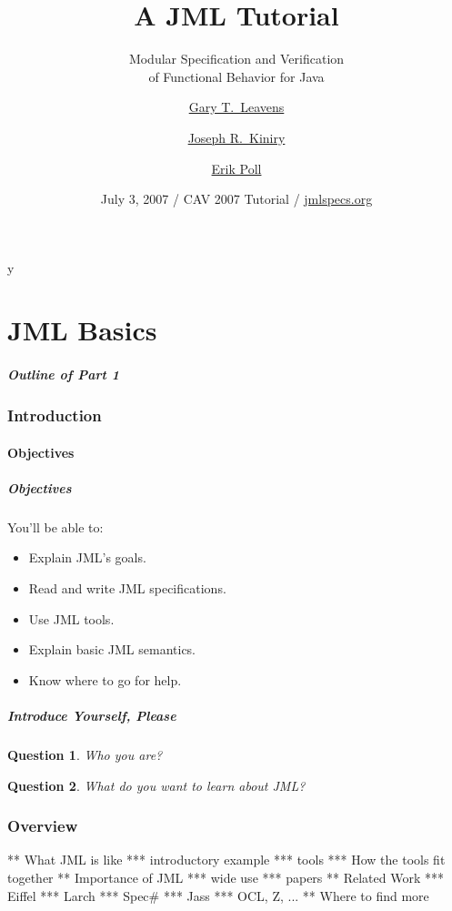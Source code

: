 \if y\MAKEHANDOUTS \documentclass[compress,landscape,handout]{beamer}
\title[JML Tutorial]{A JML Tutorial}
\subtitle{Modular Specification and Verification \\
of Functional Behavior for Java}
\author[Gary T. Leavens] %
{\href{http://www.cs.iastate.edu/~leavens/}{Gary T.~Leavens}\inst{1}
  \and \href{http://secure.ucd.ie/~kiniry/}{Joseph R.~Kiniry}\inst{2}
  \and \href{http://www.cs.ru.nl/~erikpoll/}{Erik Poll}\inst{3}}
\institute[ISU] %
{
  \inst{1}%
  Department of Computer Science\\
  Iowa State University (moving to UCF)
  \and
  \inst{2}%
  School of Computer Science and Informatics \\
  University College Dublin
  \and
  \inst{3}%
  Computing Science Department \\
  Radboud University Nijmegen
}
\date[CAV 2007]{July 3, 2007 / CAV 2007 Tutorial / \href{http://www.jmlspecs.org}{jmlspecs.org}}
\newtheorem*{question}{Question}
\begin{document}
\begin{frame}
  \titlepage
\end{frame}

\part{JML Basics}

\begin{frame}
\frametitle{Outline of Part 1}
  \tableofcontents
\end{frame}

\section{Introduction}

\subsection{Objectives}

\begin{frame}
\frametitle{Objectives}

You'll be able to:
  \begin{itemize}
  \item
    Explain JML's goals.
  \item
    Read and write JML specifications.
  \item
    Use JML tools.
  \item
    Explain basic JML semantics.
  \item
    Know where to go for help.
  \end{itemize}
\end{frame}

\begin{frame}
\frametitle{Introduce Yourself, Please}

\begin{question}
Who you are?
\end{question}

\begin{question}
What do you want to learn about JML?
\end{question}
\end{frame}

\section{Overview}

** What JML is like
*** introductory example
*** tools
*** How the tools fit together
** Importance of JML
*** wide use
*** papers
** Related Work
*** Eiffel
*** Larch
*** Spec\#
*** Jass
*** OCL, Z, ...
** Where to find more
\end{document}
